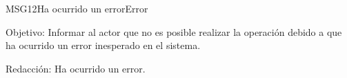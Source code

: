 \begin{mensaje}{MSG12}{Ha ocurrido un error}{Error}
	\item [Objetivo:] Informar al actor que no es posible realizar la operación debido a que ha ocurrido un error inesperado en el sistema.
	\item[Redacción:] Ha ocurrido un error.
\end{mensaje}